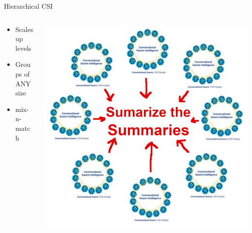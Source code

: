 \documentclass[aspectratio=169]{beamer}
\begin{document}
\begin{frame}{Hierarchical CSI}
\begin{columns}[T]
    \begin{column}[T]{0.5\textwidth}
        \begin{itemize}
            \item Scales up levels
            \item Groups of ANY size
            \item mix-n-match
        \end{itemize}
    \end{column}
    \begin{column}{0.5\textwidth}
        \includegraphics[height=0.8\textheight]{imgs/CSI_section/hierarchical_summaries.png}
    \end{column}
\end{columns}
\end{frame}
\end{document}
